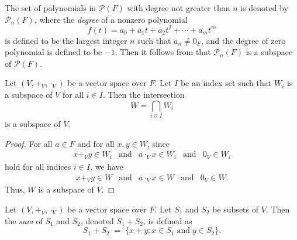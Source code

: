 \begin{example}
  The set of polynomials in $\mathcal{P}(F)$ with degree not greater than
  $n$ is denoted by $\mathcal{P}_n(F)$, where the \emph{degree} of a nonzero
  polynomial
  \begin{equation*}
    f(t) = a_0 + a_1t + a_2t^2 + \cdots + a_mt^m
  \end{equation*}
  is defined to be the largest integer $n$ such that $a_n \neq 0_F$, and the
  degree of zero polynomial is defined to be $-1$.
  Then it follows from  that $\mathcal{P}_n(F)$ is a
  subspace of $\mathcal{P}(F)$.
\end{example}

\begin{theorem}\label{thm:intersection}
  Let $(V, +_V, \cdot_V)$ be a vector space over $F$.
  Let $I$ be an index set such that $W_i$ is a subspace of $V$
  for all $i \in I$.
  Then the intersection
  \begin{equation*}
    W = \bigcap_{i \in I} W_i
  \end{equation*}
  is a subspace of $V$.
\end{theorem}
\begin{proof}
  For all $a \in F$ and for all $x, y \in W$, since
  \begin{equation*}
    \begin{array}{lllll}
      x +_V y \in W_i
      & \text{and}
      & a \cdot_V x \in W_i
      & \text{and}
      & 0_V \in W_i
    \end{array}
  \end{equation*}
  hold for all indices $i \in I$, we have
  \begin{equation*}
    \begin{array}{lllll}
      x +_V y \in W
      & \text{and}
      & a \cdot_V x \in W
      & \text{and}
      & 0_V \in W.
    \end{array}
  \end{equation*}
  Thus, $W$ is a subspace of $V$.
\end{proof}

\begin{definition}\label{def:sum-of-sets}
  Let $(V, +_V, \cdot_V)$ be a vector space over $F$.
  Let $S_1$ and $S_2$ be subsets of $V$.
  Then the \emph{sum} of $S_1$ and $S_2$, denoted $S_1 + S_2$,
  is defined as
  \begin{equation*}
    S_1 + S_2 \; = \; \{x + y: x \in S_1 \;\text{and}\; y \in S_2\}.
  \end{equation*}
\end{definition}

